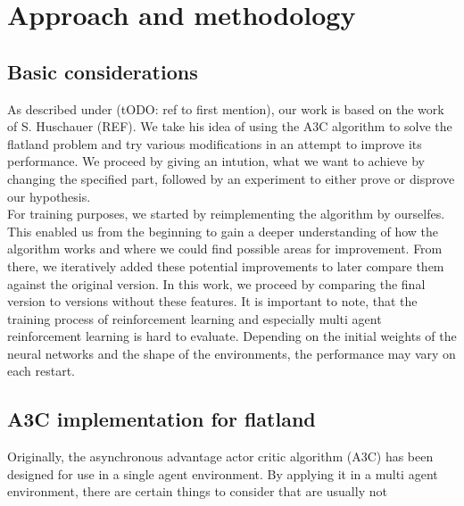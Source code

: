 %
%

\chapter{Approach and methodology}\label{chap.vorgehen}
\section{Basic considerations}\label{basic_cons}
As described under (tODO: ref to first mention), our work is based on the work of S. Huschauer (REF). We take his idea of using the A3C algorithm to solve the flatland problem and try various modifications in an attempt to improve its performance. We proceed by giving an intution, what we want to achieve by changing the specified part, followed by an experiment to either prove or disprove our hypothesis.\\
For training purposes, we started by reimplementing the algorithm by ourselfes. This enabled us from the beginning to gain a deeper understanding of how the algorithm works and where we could find possible areas for improvement. From there, we iteratively added these potential improvements to later compare them against the original version.
In this work, we proceed by comparing the final version to versions without these features. 
It is important to note, that the training process of reinforcement learning and especially multi agent reinforcement learning is hard to evaluate. Depending on the initial weights of the neural networks and the shape of the environments, the performance may vary on each restart.


\section{A3C implementation for flatland}\label{enhanced_observations}
Originally, the asynchronous advantage actor critic algorithm (A3C) has been designed for use in a single agent environment.
By applying it in a multi agent environment, there are certain things to consider that are usually not 

